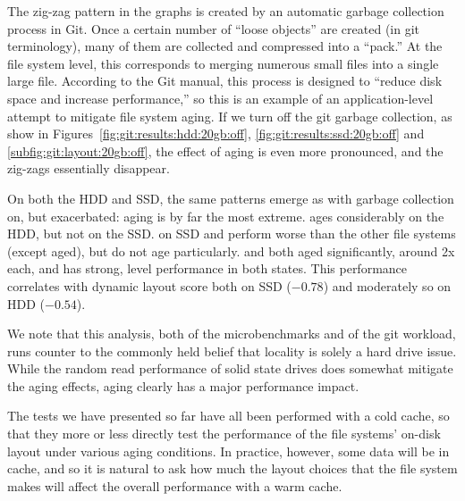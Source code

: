 

The zig-zag pattern in the graphs is created by an automatic garbage collection
process in Git. Once a certain number of ``loose objects'' are created (in git
terminology), many of them are collected and compressed into a ``pack.'' At the
file system level, this corresponds to merging numerous small files into a
single large file.  According to the Git manual, this process is designed to
``reduce disk space and increase performance,'' so this is an example of an
application-level attempt to mitigate file system aging. If we turn off the git
garbage collection, as show in Figures~\ref{fig:git:results:hdd:20gb:off},
\ref{fig:git:results:ssd:20gb:off} and \ref{subfig:git:layout:20gb:off}, the
effect of aging is even more pronounced, and the zig-zags essentially disappear.

On both the HDD and SSD, the same patterns emerge as with garbage collection
on, but exacerbated: \ftwofs aging is by far the most extreme.  \zfs ages
considerably on the HDD, but not on the SSD.  \zfs on SSD and \ext perform
worse than the other file systems (except \ftwofs aged), but do not age
particularly.  \xfs and \btrfs both aged significantly, around 2x each, and
\betrfs has strong, level performance in both states. This performance
correlates with dynamic layout score both on SSD ($-0.78$) and moderately so on
HDD ($-0.54$).

We note that this analysis, both of the microbenchmarks and of the git
workload, runs counter to the commonly held belief that locality is solely a
hard drive issue. While the random read performance of solid state drives does
somewhat mitigate the aging effects, aging clearly has a major
performance impact.


The tests we have presented so far have all been performed with a cold cache,
so that they more or less directly test the performance of the file systems'
on-disk layout under various aging conditions. In practice, however, some data
will be in cache, and so it is natural to ask how much the layout choices that
the file system makes will affect the overall performance with a warm cache.

